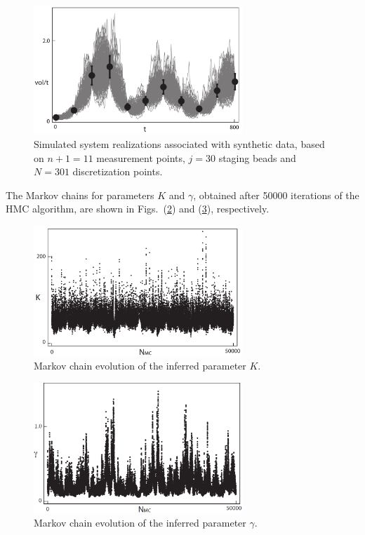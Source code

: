 \documentclass[11pt]{article}
\theoremstyle{definition}
\begin{document}
%
\begin{figure}[htb!]
    \centering
    \includegraphics[width=0.7\textwidth]{Fig3.pdf}
    \caption{Simulated system realizations associated with synthetic data, based on $n+1 = 11$ measurement points, $j=30$ staging beads and  $N=301$ discretization points.
}
    \label{fig:spaghetti}
\end{figure}
The Markov chains for parameters $K$ and $\gamma$, obtained after 50000 iterations of the HMC algorithm, are shown in Figs.~(\ref{fig:chainK}) and (\ref{fig:chainG}), respectively.


\begin{figure}[htb!]
    \centering
    \includegraphics[width=0.7\textwidth]{Fig4.pdf}
    \caption{Markov chain evolution of the inferred parameter $K$.}
    \label{fig:chainK}
\end{figure}
%
\begin{figure}[htb!]
    \centering
    \includegraphics[width=0.7\textwidth]{Fig5.pdf}
    \caption{Markov chain evolution of the inferred parameter $\gamma$.}
    \label{fig:chainG}
\end{figure}
\end{document}
